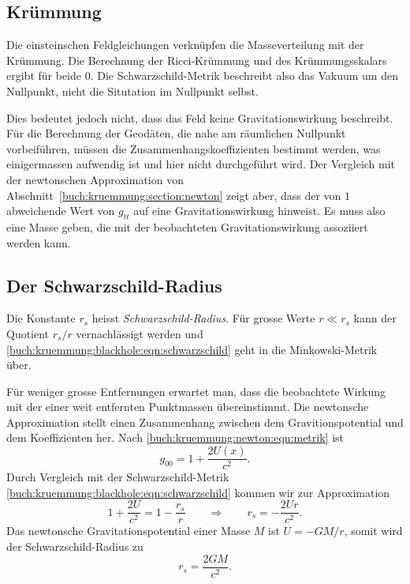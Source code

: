 \subsection{Krümmung}
Die einsteinschen Feldgleichungen verknüpfen die Masseverteilung mit
der Krümmung.
Die Berechnung der Ricci-Krümmung und des Krümmungsskalars ergibt
für beide $0$.
Die Schwarzschild-Metrik beschreibt also das Vakuum um den Nullpunkt,
nicht die Situtation im Nullpunkt selbst.

Dies bedeutet jedoch nicht, dass das Feld keine Gravitationswirkung
beschreibt.
Für die Berechnung der Geodäten, die nahe am räumlichen
Nullpunkt vorbeiführen, müssen die Zusammenhangskoeffizienten
bestimmt werden, was einigermassen aufwendig ist und hier nicht
durchgeführt wird.
Der Vergleich mit der newtonschen Approximation von
Abschnitt~\ref{buch:kruemmung:section:newton}
zeigt aber, dass der von $1$ abweichende Wert von $g_{tt}$ auf
eine Gravitationswirkung hinweist.
Es muss also eine Masse geben, die mit der beobachteten Gravitationswirkung
assoziiert werden kann.

\subsection{Der Schwarzschild-Radius}
%
Die Konstante $r_s$ heisst \emph{Schwarzschild-Radius}.
%
Für grosse Werte $r\ll r_s$ kann der Quotient $r_s/r$ vernachlässigt
werden und \eqref{buch:kruemmung:blackhole:eqn:schwarzschild} geht
in die Minkowski-Metrik über.

Für weniger grosse Entfernungen erwartet man, dass die beobachtete
Wirkung mit der einer weit entfernten Punktmassen übereinstimmt.
Die newtonsche Approximation stellt einen Zusammenhang zwischen
dem Gravitionspotential und dem Koeffizienten her.
Nach \eqref{buch:kruemmung:newton:eqn:metrik} ist
\[
g_{00} = 1+\frac{2U(x)}{c^2}.
\]
Durch Vergleich mit der Schwarzschild-Metrik
\eqref{buch:kruemmung:blackhole:eqn:schwarzschild}
kommen wir zur Approximation
\[
1
+
\frac{2U}{c^2}
=
1
-
\frac{r_s}{r}
\qquad\Rightarrow\qquad
r_s
=
-
\frac{2Ur}{c^2}.
\]
Das newtonsche Gravitationspotential einer Masse $M$ ist $U=-GM/r$,
somit wird der Schwarzschild-Radius zu
\[
r_s
=
\frac{2GM}{c^2}.
\]

